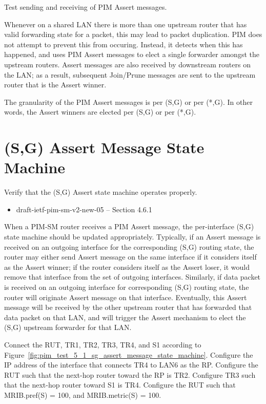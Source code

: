 \documentclass[11pt]{report}
\begin{document}
Test sending and receiving of PIM Assert messages.

Whenever on a shared LAN there is more than one upstream router that has valid
forwarding state for a packet, this may lead to packet duplication.
PIM does not attempt to prevent this from occuring. Instead, it detects when
this has happened, and uses PIM Assert messages to elect a single forwarder
amongst the upstream routers. Assert messages are also received by downstream
routers on the LAN; as a result, subsequent Join/Prune messages are sent to
the upstream router that is the Assert winner.

The granularity of the PIM Assert messages is per (S,G) or per (*,G).
In other words, the Assert winners are elected per (S,G) or per (*,G).


\newpage
\section{(S,G) Assert Message State Machine}

Verify that the (S,G) Assert state machine operates properly.

\begin{itemize}
  \item draft-ietf-pim-sm-v2-new-05 -- Section 4.6.1
\end{itemize}

When a PIM-SM router receives a PIM Assert message, the per-interface
(S,G) state machine should be updated appropriately. Typically, if an
Assert message is received on an outgoing interface for the corresponding
(S,G) routing state, the router may either send Assert message on the
same interface if it considers itself as the Assert winner; if the router
considers itself as the Assert loser, it would remove that interface from the
set of outgoing interfaces. Similarly, if data packet is received on an
outgoing interface for corresponding (S,G) routing state, the router will
originate Assert message on that interface. Eventually, this Assert message
will be received by the other upstream router that has forwarded that data
packet on that LAN, and will trigger the Assert mechanism to elect the (S,G)
upstream forwarder for that LAN.

Connect the RUT, TR1, TR2, TR3, TR4, and S1 according to
Figure~\ref{fig:pim_test_5_1_sg_assert_message_state_machine}.
Configure the IP address of the interface that connects TR4 to LAN6 as the RP.
Configure the RUT such that the next-hop router toward the RP is TR2.
Configure TR3 such that the next-hop router toward S1 is TR4.
Configure the RUT such that MRIB.pref(S) = 100, and MRIB.metric(S) = 100.
\end{document}
